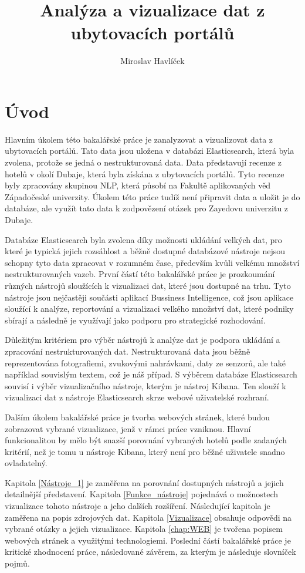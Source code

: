\documentclass[czech,BP]{thesiskiv}
\author{Miroslav Havlíček}
\title{Analýza a vizualizace dat z ubytovacích portálů}
\begin{document}
%
\maketitle
\tableofcontents
\chapter{Úvod}
Hlavním úkolem této bakalářské práce je zanalyzovat a vizualizovat data z ubytovacích portálů. Tato data jsou uložena v databázi Elasticsearch, která byla zvolena, protože se jedná o nestrukturovaná data. Data představují recenze z hotelů v okolí Dubaje, která byla získána z ubytovacích portálů. Tyto recenze byly zpracovány skupinou NLP, která působí na Fakultě aplikovaných věd Západočeské univerzity. Úkolem této práce tudíž není připravit data a uložit je do databáze, ale využít tato data k zodpovězení otázek pro Zayedovu univerzitu z Dubaje.


Databáze Elasticsearch byla zvolena díky možnosti ukládání velkých dat, pro které je typická jejich rozsáhlost a běžně dostupné databázové nástroje nejsou schopny tyto data zpracovat v rozumném čase, především kvůli velkému množství nestrukturovaných vazeb.\cite{BigData} První částí této bakalářské práce je prozkoumání různých nástrojů sloužících k vizualizaci dat, které jsou dostupné na trhu. Tyto nástroje jsou nejčastěji součásti aplikací Bussiness Intelligence, což jsou aplikace sloužící k analýze, reportování a vizualizaci velkého množství dat, které podniky sbírají a následně je využívají jako podporu pro strategické rozhodování. 


Důležitým kritériem pro výběr nástrojů k analýze dat je podpora ukládání a zpracování nestrukturovaných dat. Nestrukturovaná data jsou běžně reprezentována fotografiemi, zvukovými nahrávkami, daty ze senzorů, ale také například  souvislým textem, což je náš případ. S výběrem databáze Elasticsearch souvisí i výběr vizualizačního nástroje, kterým je nástroj Kibana. Ten slouží k vizualizaci dat z nástroje Elasticsearch skrze webové uživatelské rozhraní.


Dalším úkolem bakalářské práce je tvorba webových stránek, které budou zobrazovat vybrané vizualizace, jenž v rámci práce vzniknou. Hlavní funkcionalitou by mělo být snazší porovnání vybraných hotelů podle zadaných kritérií, než je tomu u nástroje Kibana, který není pro běžné uživatele snadno ovladatelný.


Kapitola \ref{Nástroje_1} je zaměřena na porovnání dostupných nástrojů a jejich detailnější představení. Kapitola \ref{Funkce_nástroje} pojednává o možnostech vizualizace tohoto nástroje a jeho dalších rozšíření. Následující kapitola je zaměřena na popis zdrojových dat. Kapitola \ref{Vizualizace} obsahuje odpovědi na vybrané otázky a jejich vizualizace. Kapitola \ref{chap:WEB} je tvořena popisem webových stránek a využitými technologiemi. Poslední částí bakalářské práce je kritické zhodnocení práce, následované závěrem, za kterým je následuje slovníček pojmů.
\end{document}

